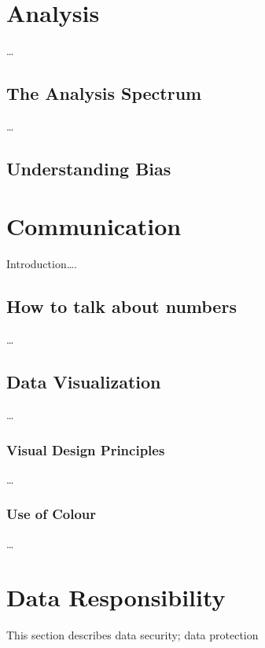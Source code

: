 \documentclass[letterpaper,10pt,english]{jupyterBook}
\begin{document}
\chapter{Analysis}
\label{\detokenize{part1/analysis:analysis}}\label{\detokenize{part1/analysis::doc}}
\sphinxAtStartPar
…


\section{The Analysis Spectrum}
\label{\detokenize{part1/analysis:the-analysis-spectrum}}
\sphinxAtStartPar
…


\section{Understanding Bias}
\label{\detokenize{part1/analysis:understanding-bias}}

\chapter{Communication}
\label{\detokenize{part1/communication:communication}}\label{\detokenize{part1/communication::doc}}
\sphinxAtStartPar
Introduction….


\section{How to talk about numbers}
\label{\detokenize{part1/communication:how-to-talk-about-numbers}}
\sphinxAtStartPar
…


\section{Data Visualization}
\label{\detokenize{part1/communication:data-visualization}}
\sphinxAtStartPar
…


\subsection{Visual Design Principles}
\label{\detokenize{part1/communication:visual-design-principles}}
\sphinxAtStartPar
…


\subsection{Use of Colour}
\label{\detokenize{part1/communication:use-of-colour}}
\sphinxAtStartPar
…


\chapter{Data Responsibility}
\label{\detokenize{part1/data responsibility:data-responsibility}}\label{\detokenize{part1/data responsibility::doc}}
\sphinxAtStartPar
This section describes data security; data protection
\end{document}
